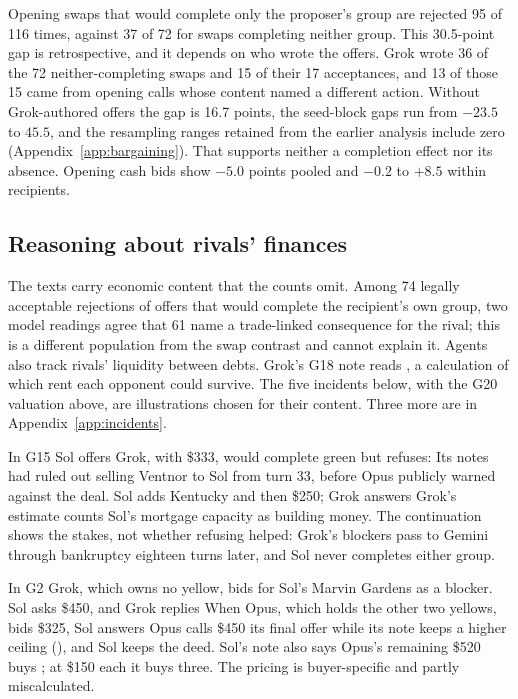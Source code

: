 \documentclass[10pt,twocolumn,letterpaper]{article}
\begin{document}
Opening swaps that would complete only the proposer's group are rejected 95 of 116 times, against 37 of 72 for swaps completing neither group. This 30.5-point gap is retrospective, and it depends on who wrote the offers. Grok wrote 36 of the 72 neither-completing swaps and 15 of their 17 acceptances, and 13 of those 15 came from opening calls whose content named a different action. Without Grok-authored offers the gap is 16.7 points, the seed-block gaps run from $-23.5$ to $45.5$, and the resampling ranges retained from the earlier analysis include zero (Appendix~\ref{app:bargaining}). That supports neither a completion effect nor its absence. Opening cash bids show $-5.0$ points pooled and $-0.2$ to $+8.5$ within recipients.

\subsection{Reasoning about rivals' finances}
The texts carry economic content that the counts omit. Among 74 legally acceptable rejections of offers that would complete the recipient's own group, two model readings agree that 61 name a trade-linked consequence for the rival; this is a different population from the swap contrast and cannot explain it. Agents also track rivals' liquidity between debts. Grok's G18 note reads , a calculation of which rent each opponent could survive. The five incidents below, with the G20 valuation above, are illustrations chosen for their content. Three more are in Appendix~\ref{app:incidents}.

\begin{incident}
In G15 Sol offers  Grok, with \$333, would complete green but refuses:  Its notes had ruled out selling Ventnor to Sol from turn 33, before Opus publicly warned against the deal. Sol adds Kentucky and then \$250; Grok answers  Grok's estimate counts Sol's mortgage capacity as building money. The continuation shows the stakes, not whether refusing helped: Grok's blockers pass to Gemini through bankruptcy eighteen turns later, and Sol never completes either group.
\end{incident}

\begin{incident}
In G2 Grok, which owns no yellow, bids for Sol's Marvin Gardens as a blocker. Sol asks \$450, and Grok replies  When Opus, which holds the other two yellows, bids \$325, Sol answers  Opus calls \$450 its final offer while its note keeps a higher ceiling (), and Sol keeps the deed. Sol's note also says Opus's remaining \$520 buys ; at \$150 each it buys three. The pricing is buyer-specific and partly miscalculated.
\end{incident}
\end{document}
